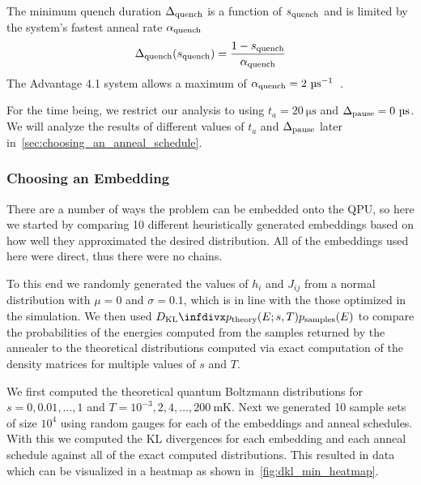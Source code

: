 The minimum quench duration \( \Delta_{\text{quench}} \) is a function of \( s_{\text{quench}} \) and is limited by the system's fastest anneal rate \( \alpha_{\text{quench}} \)
\begin{align}
    \Delta_{\text{quench}}(s_{\text{quench}}) = \frac{1 - s_{\text{quench}}}{\alpha_{\text{quench}}}
\end{align}
The Advantage 4.1 system allows a maximum of \( \alphaquench = 2 \ \si{\micro\second}^{-1} \)~\cite{dwave_solver_parameters}.

For the time being, we restrict our analysis to using \( t_a = 20 \ \si{\micro\second} \) and \( \Deltapause = 0 \ \si{\micro\second} \).
We will analyze the results of different values of \( t_a \) and \( \Delta_{\text{pause}} \) later in~\cref{sec:choosing_an_anneal_schedule}.

\subsubsection{Choosing an Embedding}
There are a number of ways the problem can be embedded onto the QPU, so here we started by comparing 10 different heuristically generated embeddings based on how well they approximated the desired distribution.
All of the embeddings used here were direct, thus there were no chains.

To this end we randomly generated the values of \( h_i \) and \( J_{ij} \) from a normal distribution with \( \mu = 0 \) and \( \sigma = 0.1 \), which is in line with the those optimized in the simulation.
We then used \( \DKL{\ptheory(E;s,T)}{\psamples(E)} \) to compare the probabilities of the energies computed from the samples returned by the annealer to the theoretical distributions computed via exact computation of the density matrices for multiple values of \( s \) and \( T \).

We first computed the theoretical quantum Boltzmann distributions for \( s = 0, 0.01, \dots, 1 \) and \( T = 10^{-3}, 2, 4, \dots, 200 \ \si{\milli\kelvin} \).
Next we generated 10 sample sets of size \( 10^4 \) using random gauges for each of the embeddings and anneal schedules.
With this we computed the KL divergences for each embedding and each anneal schedule against all of the exact computed distributions.
This resulted in data which can be visualized in a heatmap as shown in~\cref{fig:dkl_min_heatmap}.

